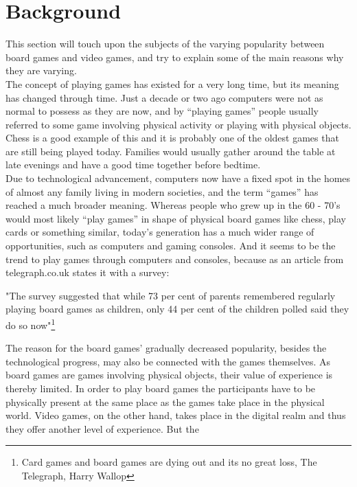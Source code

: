 
\section{Background}

This section will touch upon the subjects of the varying popularity between
 board games and video games, and try to explain some of the main reasons why
 they are varying.\newline
\\
The concept of playing games has existed for a very long time, but its meaning
 has changed through time. Just a decade or two ago computers were not as
 normal to possess as they are now, and by “playing games” people usually
 referred to some game involving physical activity or playing with physical
  objects. Chess is a good example of this and it is probably one of the
  oldest games that are still being played today.
Families would usually gather around the table at late evenings and have a
good time together before bedtime.\newline
\\
Due to technological advancement, computers now have a fixed spot in the
 homes of almost any family living in modern societies, and the term “games”
 has reached a much broader meaning. Whereas people who grew up in the
  60 - 70’s would most likely “play games” in shape of physical board
  games like chess, play cards or something similar, today’s generation
  has a much wider range of opportunities, such as computers and gaming
   consoles. And it seems to be the trend to play games through computers
    and consoles, because as an article from telegraph.co.uk states it with
     a survey:
\begin{displayquote}
"The survey suggested that while 73 per cent of parents remembered regularly
 playing board games as children, only 44 per cent of the children polled said
 they do so now"\footnote{Card games and board games are dying out and its no great loss, The Telegraph, Harry Wallop}
\end{displayquote}
The reason for the board games' gradually decreased popularity, besides
 the technological progress, may also be connected with the games themselves.
  As board games are games involving physical objects, their value of
   experience is thereby limited. In order to play board games the participants
   have to be physically present at the same place as the games take place in
   the physical world. Video games, on the other hand, takes place in the
   digital realm and thus they offer another level of experience. But the
